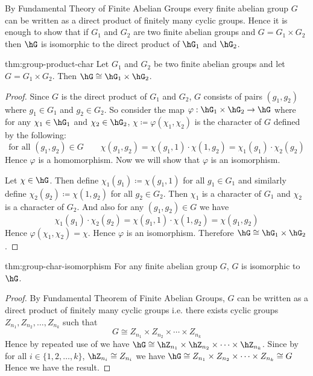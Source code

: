 By Fundamental Theory of Finite Abelian Groups every finite abelian group $G$ can be written as a direct product of finitely many cyclic groups. Hence it is enough to show that if $G_1$ and $G_2$ are two finite abelian groups and $G=G_1\times G_2$ then $\hG$ is isomorphic to the direct product of $\hG_1$ and $\hG_2$.
\begin{Theorem}{}{thm:group-product-char}
  Let $G_1$ and $G_2$ be two finite abelian groups and let $G=G_1\times G_2$. Then $\hG\cong \hG_1\times \hG_2$.
\end{Theorem}
\begin{proof}
  Since $G$ is the direct product of $G_1$ and $G_2$, $G$ consists of pairs $(g_1,g_2)$ where $g_1\in G_1$ and $g_2\in G_2$. So consider the map $\varphi:\hG_1\times \hG_2\to \hG$ where for any $\chi_1\in \hG_1$ and $\chi_2\in \hG_2$, $\chi\coloneqq \varphi(\chi_1,\chi_2)$ is the character of $G$ defined by the following: $$\text{for all }(g_1,g_2)\in G\qquad \chi(g_1,g_2)=\chi(g_1,1)\cdot \chi(1,g_2)=\chi_1(g_1)\cdot \chi_2(g_2)$$Hence $\varphi$ is a homomorphism. Now we will show that $\varphi$ is an isomorphism.

  Let $\chi\in \hG$. Then define $\chi_1(g_1)\coloneqq\chi(g_1,1)$ for all $g_1\in G_1$ and similarly define $\chi_2(g_2)\coloneqq\chi(1,g_2)$ for all $g_2\in G_2$. Then $\chi_1$ is a character of $G_1$ and $\chi_2$ is a character of $G_2$. And also for any $(g_1,g_2)\in G$ we have $$\chi_1(g_1)\cdot \chi_2(g_2)=\chi(g_1,1)\cdot \chi(1,g_2)=\chi(g_1,g_2)$$ Hence $\varphi(\chi_1,\chi_2)=\chi$. Hence $\varphi$ is an isomorphism. Therefore $\hG\cong \hG_1\times \hG_2$.
\end{proof}

\begin{Theorem}{}{thm:group-char-isomorphism}
  For any finite abelian group $G$, $G$ is isomorphic to $\hG$.
\end{Theorem}
\begin{proof}
  By Fundamental Theorem of Finite Abelian Groups, $G$ can be written as a direct product of finitely many cyclic groups i.e. there exists cyclic groups $Z_{n_1},Z_{n_2},\dots, Z_{n_k}$ such that $$G\cong Z_{n_1}\times Z_{n_2}\times \cdots \times Z_{n_k}$$ Hence by repeated use of  we have $\hG\cong \hZ_{n_1}\times \hZ_{n_2}\times \cdots \times \hZ_{n_k}$. Since by  for all $i\in\{1,2,\dots, k\}$, $\hZ_{n_i}\cong Z_{n_i}$ we have $\hG\cong Z_{n_1}\times Z_{n_2}\times \cdots \times Z_{n_k}\cong G$ Hence we have the result.
\end{proof}